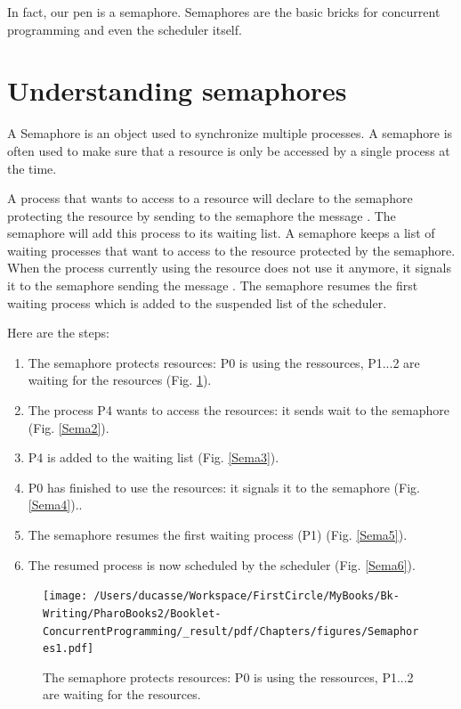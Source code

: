 \documentclass[10pt,twoside,english]{_support/latex/sbabook/sbabook}
\begin{document}
In fact, our pen is a semaphore. Semaphores are the basic bricks for concurrent programming and even the scheduler itself.
\section{Understanding semaphores}
A Semaphore is an object used to synchronize multiple processes.
A semaphore is often used to make sure that a resource is only be accessed by a single process at the time.

A process that wants to access to a resource will declare to the semaphore protecting the resource by sending
to the semaphore the message . 
The semaphore will add this process to its waiting list. 
A semaphore keeps a list of waiting processes that want to access to the resource protected by the semaphore.
When the process currently using the resource does not use it anymore, it signals it to the semaphore sending the message . 
The semaphore resumes the first waiting process which is added to the suspended list of the scheduler.

Here are the steps:

\begin{enumerate}
\item The semaphore protects resources: P0 is using the ressources, P1...2 are waiting for the resources (Fig. \ref{Sema1}).
\item The process P4 wants to access the resources: it sends wait to the semaphore (Fig. \ref{Sema2}).
\item P4 is added to the waiting list (Fig. \ref{Sema3}).
\item P0 has finished to use the resources: it signals it to the semaphore  (Fig. \ref{Sema4})..
\item The semaphore resumes the first waiting process (P1) (Fig. \ref{Sema5}).
\item The resumed process is now scheduled by the scheduler  (Fig. \ref{Sema6}).
\end{enumerate}


\begin{figure}

\begin{center}
\texttt{[image: /Users/ducasse/Workspace/FirstCircle/MyBooks/Bk-Writing/PharoBooks2/Booklet-ConcurrentProgramming/\_result/pdf/Chapters/figures/Semaphores1.pdf]}\caption{The semaphore protects resources: P0 is using the ressources, P1...2 are waiting for the resources. \label{Sema1}}\end{center}
\end{figure}
\end{document}
